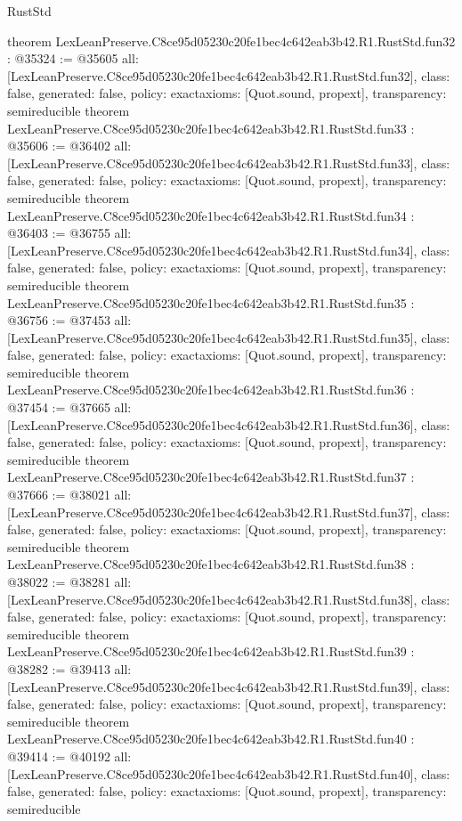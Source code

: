 \begin{lexlean}{RustStd}
\begin{coremodule}
{}
theorem LexLeanPreserve.C8ce95d05230c20fe1bec4c642eab3b42.R1.RustStd.fun32 : @35324 := @35605 {
  all: [LexLeanPreserve.C8ce95d05230c20fe1bec4c642eab3b42.R1.RustStd.fun32],
  class: false,
  generated: false,
  policy: exact{axioms: [Quot.sound, propext]},
  transparency: semireducible
}
theorem LexLeanPreserve.C8ce95d05230c20fe1bec4c642eab3b42.R1.RustStd.fun33 : @35606 := @36402 {
  all: [LexLeanPreserve.C8ce95d05230c20fe1bec4c642eab3b42.R1.RustStd.fun33],
  class: false,
  generated: false,
  policy: exact{axioms: [Quot.sound, propext]},
  transparency: semireducible
}
theorem LexLeanPreserve.C8ce95d05230c20fe1bec4c642eab3b42.R1.RustStd.fun34 : @36403 := @36755 {
  all: [LexLeanPreserve.C8ce95d05230c20fe1bec4c642eab3b42.R1.RustStd.fun34],
  class: false,
  generated: false,
  policy: exact{axioms: [Quot.sound, propext]},
  transparency: semireducible
}
theorem LexLeanPreserve.C8ce95d05230c20fe1bec4c642eab3b42.R1.RustStd.fun35 : @36756 := @37453 {
  all: [LexLeanPreserve.C8ce95d05230c20fe1bec4c642eab3b42.R1.RustStd.fun35],
  class: false,
  generated: false,
  policy: exact{axioms: [Quot.sound, propext]},
  transparency: semireducible
}
theorem LexLeanPreserve.C8ce95d05230c20fe1bec4c642eab3b42.R1.RustStd.fun36 : @37454 := @37665 {
  all: [LexLeanPreserve.C8ce95d05230c20fe1bec4c642eab3b42.R1.RustStd.fun36],
  class: false,
  generated: false,
  policy: exact{axioms: [Quot.sound, propext]},
  transparency: semireducible
}
theorem LexLeanPreserve.C8ce95d05230c20fe1bec4c642eab3b42.R1.RustStd.fun37 : @37666 := @38021 {
  all: [LexLeanPreserve.C8ce95d05230c20fe1bec4c642eab3b42.R1.RustStd.fun37],
  class: false,
  generated: false,
  policy: exact{axioms: [Quot.sound, propext]},
  transparency: semireducible
}
theorem LexLeanPreserve.C8ce95d05230c20fe1bec4c642eab3b42.R1.RustStd.fun38 : @38022 := @38281 {
  all: [LexLeanPreserve.C8ce95d05230c20fe1bec4c642eab3b42.R1.RustStd.fun38],
  class: false,
  generated: false,
  policy: exact{axioms: [Quot.sound, propext]},
  transparency: semireducible
}
theorem LexLeanPreserve.C8ce95d05230c20fe1bec4c642eab3b42.R1.RustStd.fun39 : @38282 := @39413 {
  all: [LexLeanPreserve.C8ce95d05230c20fe1bec4c642eab3b42.R1.RustStd.fun39],
  class: false,
  generated: false,
  policy: exact{axioms: [Quot.sound, propext]},
  transparency: semireducible
}
theorem LexLeanPreserve.C8ce95d05230c20fe1bec4c642eab3b42.R1.RustStd.fun40 : @39414 := @40192 {
  all: [LexLeanPreserve.C8ce95d05230c20fe1bec4c642eab3b42.R1.RustStd.fun40],
  class: false,
  generated: false,
  policy: exact{axioms: [Quot.sound, propext]},
  transparency: semireducible
}
\end{coremodule}
\end{lexlean}
